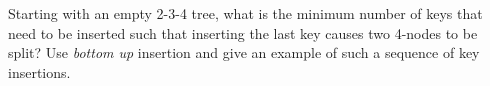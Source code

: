 Starting with an empty 2-3-4 tree, what is the minimum number of
keys that need to be inserted such that inserting the last key causes
two 4-nodes to be split? Use {\em bottom up} insertion and give an
example of such a sequence of key insertions.

